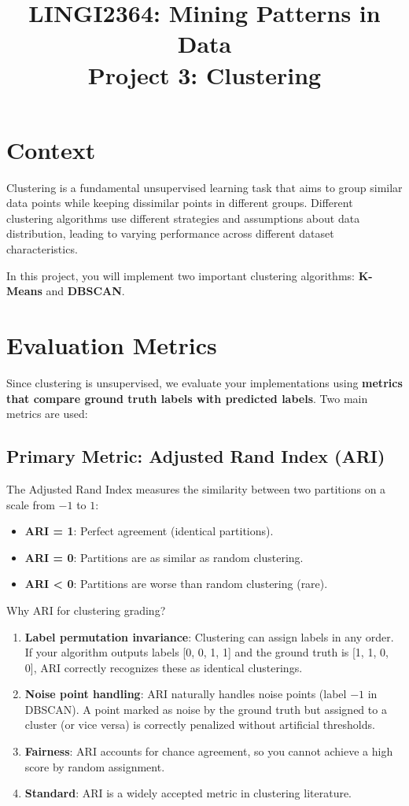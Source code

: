 \documentclass[]{article}
\title{LINGI2364: Mining Patterns in Data \\ \bf Project 3: Clustering}
\date{}
\begin{document}
	\maketitle
	
	\section{Context}
	
	Clustering is a fundamental unsupervised learning task that aims to group similar data points while keeping dissimilar points in different groups. Different clustering algorithms use different strategies and assumptions about data distribution, leading to varying performance across different dataset characteristics.
	
	In this project, you will implement two important clustering algorithms: \textbf{K-Means} and \textbf{DBSCAN}.
	
	
	\section{Evaluation Metrics}
	
	Since clustering is unsupervised, we evaluate your implementations using \textbf{metrics that compare ground truth labels with predicted labels}. Two main metrics are used:
	
	\subsection{Primary Metric: Adjusted Rand Index (ARI)}
	
	The Adjusted Rand Index measures the similarity between two partitions on a scale from $-1$ to $1$:
	
	\begin{itemize}
		\item \textbf{ARI = 1}: Perfect agreement (identical partitions).
		\item \textbf{ARI = 0}: Partitions are as similar as random clustering.
		\item \textbf{ARI < 0}: Partitions are worse than random clustering (rare).
	\end{itemize}
	
	Why ARI for clustering grading?
	
	\begin{enumerate}
		\item \textbf{Label permutation invariance}: Clustering can assign labels in any order. If your algorithm outputs labels [0, 0, 1, 1] and the ground truth is [1, 1, 0, 0], ARI correctly recognizes these as identical clusterings.
		\item \textbf{Noise point handling}: ARI naturally handles noise points (label $-1$ in DBSCAN). A point marked as noise by the ground truth but assigned to a cluster (or vice versa) is correctly penalized without artificial thresholds.
		\item \textbf{Fairness}: ARI accounts for chance agreement, so you cannot achieve a high score by random assignment.
		\item \textbf{Standard}: ARI is a widely accepted metric in clustering literature.
	\end{enumerate}
	
\end{document}
